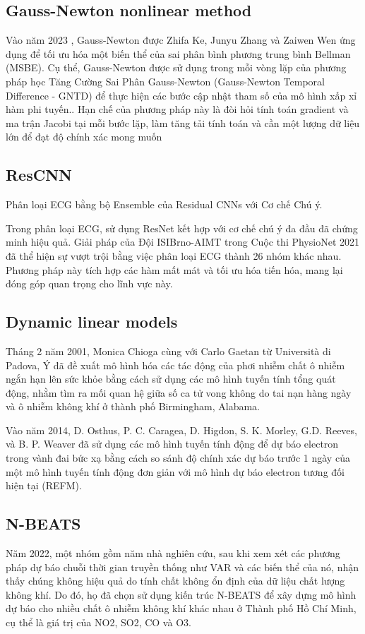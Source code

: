 \documentclass[conference]{IEEEtran}
\begin{document}
\subsection{Gauss-Newton nonlinear method}

Vào năm 2023 , Gauss-Newton được Zhifa Ke, Junyu Zhang và Zaiwen Wen ứng dụng để tối ưu hóa một biến thể của sai phân bình phương trung bình Bellman (MSBE). Cụ thể, Gauss-Newton được sử dụng trong mỗi vòng lặp của phương pháp học Tăng Cường Sai Phân Gauss-Newton (Gauss-Newton Temporal Difference - GNTD) để thực hiện các bước cập nhật tham số của mô hình xấp xỉ hàm phi tuyến.\cite{gaussnewtonrelated}. Hạn chế của phương pháp này là đòi hỏi tính toán gradient và ma trận Jacobi tại mỗi bước lặp, làm tăng tải tính toán và cần một lượng dữ liệu lớn để đạt độ chính xác mong muốn

\subsection{ResCNN}
Phân loại ECG bằng bộ Ensemble của Residual CNNs với Cơ chế Chú ý.

Trong phân loại ECG, sử dụng ResNet kết hợp với cơ chế chú ý đa đầu đã chứng minh hiệu quả. Giải pháp của Đội ISIBrno-AIMT trong Cuộc thi PhysioNet 2021 đã thể hiện sự vượt trội bằng việc phân loại ECG thành 26 nhóm khác nhau. Phương pháp này tích hợp các hàm mất mát và tối ưu hóa tiến hóa, mang lại đóng góp quan trọng cho lĩnh vực này. \cite{b4}

\subsection{Dynamic linear models}
Tháng 2 năm 2001, Monica Chioga cùng với Carlo Gaetan từ Università di Padova, Ý đã đề xuất mô hình hóa các tác động của phơi nhiễm chất ô nhiễm ngắn hạn lên sức khỏe bằng cách sử dụng các mô hình tuyến tính tổng quát động, nhằm tìm ra mối quan hệ giữa số ca tử vong không do tai nạn hàng ngày và ô nhiễm không khí ở thành phố Birmingham, Alabama. \cite{b5}

Vào năm 2014, D. Osthus, P. C. Caragea, D. Higdon, S. K. Morley, G.D. Reeves, và B. P. Weaver đã sử dụng các mô hình tuyến tính động để dự báo electron trong vành đai bức xạ bằng cách so sánh độ chính xác dự báo trước 1 ngày của một mô hình tuyến tính động đơn giản với mô hình dự báo electron tương đối hiện tại (REFM). \cite{b6}

\subsection{N-BEATS}
Năm 2022, một nhóm gồm năm nhà nghiên cứu, sau khi xem xét các phương pháp dự báo chuỗi thời gian truyền thống như VAR và các biến thể của nó, nhận thấy chúng không hiệu quả do tính chất không ổn định của dữ liệu chất lượng không khí. Do đó, họ đã chọn sử dụng kiến trúc N-BEATS \cite{b8} để xây dựng mô hình dự báo cho nhiều chất ô nhiễm không khí khác nhau ở Thành phố Hồ Chí Minh, cụ thể là giá trị của NO2, SO2, CO và O3.
\end{document}
